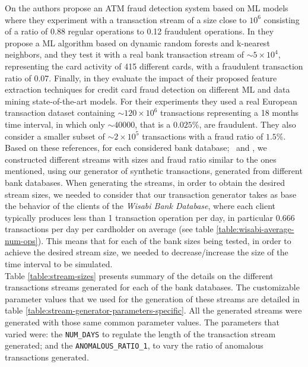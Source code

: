 On \cite{exps-atmfrauddetectionstreamdata} the authors propose an ATM fraud detection system based on ML models where they experiment with a transaction stream of a size close to $10^{6}$ consisting of a ratio of 0.88 regular operations to 0.12 fraudulent operations. In \cite{exps-costsensitivepayment} they propose a ML algorithm based on dynamic random forests and k-nearest neighbors, and they test it with a real bank transaction stream of $\sim5 \times 10^{4}$, representing the card activity of 415 different cards, with a fraudulent transaction ratio of 0.07. Finally, in \cite{exps-featureengineering} they evaluate the impact of their proposed feature extraction techniques for credit card fraud detection on different ML and data mining state-of-the-art models. For their experiments they used a real European transaction dataset containing $\sim120 \times 10^{6}$ transactions representing a 18 months time interval, in which only $\sim40000$, that is a $0.025\%$, are fraudulent. They also consider a smaller subset of $\sim 2 \times 10^{5}$ transactions with a fraud ratio of $1.5\%$.\\

Based on these references, for each considered bank database; \smallG\ and \mediumG, we constructed different streams with sizes and fraud ratio similar to the ones mentioned, using our generator of synthetic transactions, generated from different bank databases. When generating the streams, in order to obtain the desired stream sizes, we needed to consider that our transaction generator takes as base the behavior of the clients of the \emph{Wisabi Bank Database}, where each client typically produces less than 1 transaction operation per day, in particular $\mathsf{0.666}$ transactions per day per cardholder on average (see table \ref{table:wisabi-average-num-ops}). This means that for each of the bank sizes being tested, in order to achieve the desired stream size, we needed to decrease/increase the size of the time interval to be simulated.\\

Table \ref{table:stream-sizes} presents summary of the details on the different transactions streams generated for each of the bank databases. The customizable parameter values that we used for the generation of these streams are detailed in table \ref{table:stream-generator-parameters-specific}. All the generated streams were generated with those same common parameter values. The parameters that varied were: the \texttt{NUM\_DAYS} to regulate the length of the transaction stream generated; and the \texttt{ANOMALOUS\_RATIO\_1}, to vary the ratio of anomalous transactions generated.

